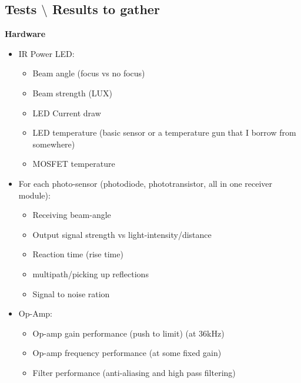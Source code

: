 \subsection{Tests $\setminus$ Results to gather}
\textbf{Hardware}
\begin{itemize}
	\item IR Power LED:
	\begin{itemize}
		\item Beam angle (focus vs no focus)
		\item Beam strength (LUX)
		\item LED Current draw
		\item LED temperature (basic sensor or a temperature gun that I borrow from somewhere)
		\item MOSFET temperature
	\end{itemize}
	\item For each photo-sensor (photodiode, phototransistor, all in one receiver module):
	\begin{itemize}
		\item Receiving beam-angle
		\item Output signal strength vs light-intensity/distance
		\item Reaction time (rise time)
		\item multipath/picking up reflections
		\item Signal to noise ration
	\end{itemize}
	\item Op-Amp:
	\begin{itemize}
		\item Op-amp gain performance (push to limit) (at 36kHz)
		\item Op-amp frequency performance (at some fixed gain)
		\item Filter performance (anti-aliasing and high pass filtering)
	\end{itemize}
\end{itemize}

